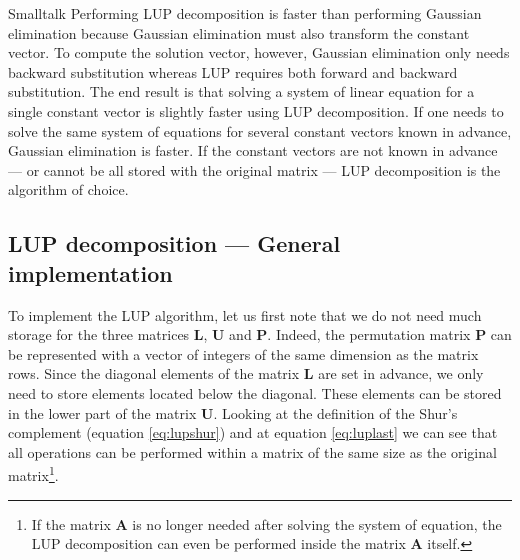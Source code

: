 \begin{displaycode}{Smalltalk}
Performing LUP decomposition is faster than performing Gaussian
elimination because Gaussian elimination must also transform the
constant vector. To compute the solution vector, however, Gaussian
elimination only needs backward substitution whereas LUP requires
both forward and backward substitution. The end result is that
solving a system of linear equation for a single constant vector
is slightly faster using LUP decomposition. If one needs to solve
the same system of equations for several constant vectors known in
advance, Gaussian elimination is faster. If the constant vectors
are not known in advance --- or cannot be all stored with the
original matrix --- LUP decomposition is the algorithm of choice.

\subsection{LUP decomposition --- General implementation}
To implement the LUP algorithm, let us
first note that we do not need much storage for the three matrices
$\textbf{L}$, $\textbf{U}$ and $\textbf{P}$. Indeed, the permutation matrix
$\textbf{P}$ can be represented with a vector of integers of the same
dimension as the matrix rows. Since the diagonal elements of the
matrix $\textbf{L}$ are set in advance, we only need to store
elements located below the diagonal. These elements can be stored
in the lower part of the matrix $\textbf{U}$. Looking at the
definition of the Shur's complement (equation \ref{eq:lupshur})
and at equation \ref{eq:luplast} we can see that all operations
can be performed within a matrix of the same size as the original
matrix\footnote{If the matrix $\textbf{A}$ is no longer needed after
solving the system of equation, the LUP decomposition can even be
performed inside the matrix $\textbf{A}$ itself.}.


\end{displaycode}

